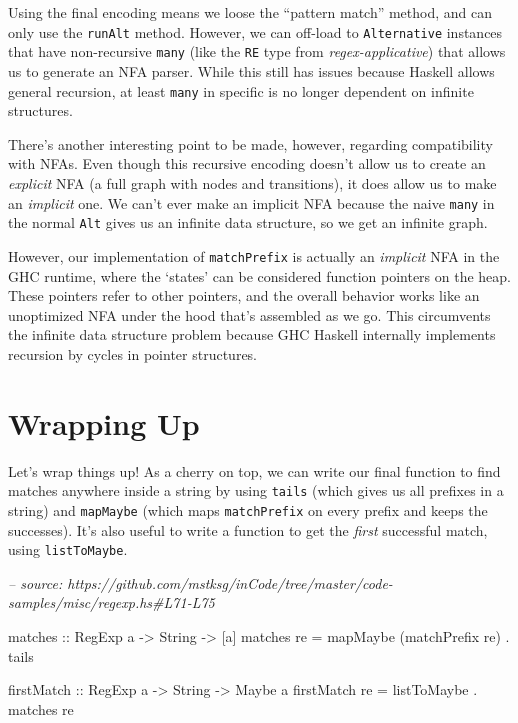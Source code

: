 \documentclass[]{article}
\newenvironment{Shaded}{}{}
\newcommand{\CommentTok}[1]{\textcolor[rgb]{0.38,0.63,0.69}{\textit{#1}}}
\newcommand{\DataTypeTok}[1]{\textcolor[rgb]{0.56,0.13,0.00}{#1}}
\newcommand{\FunctionTok}[1]{\textcolor[rgb]{0.02,0.16,0.49}{#1}}
\newcommand{\NormalTok}[1]{#1}
\newcommand{\OtherTok}[1]{\textcolor[rgb]{0.00,0.44,0.13}{#1}}
\begin{document}
Using the final encoding means we loose the ``pattern match'' method, and can
only use the \texttt{runAlt} method. However, we can off-load to
\texttt{Alternative} instances that have non-recursive \texttt{many} (like the
\texttt{RE} type from \emph{regex-applicative}) that allows us to generate an
NFA parser. While this still has issues because Haskell allows general
recursion, at least \texttt{many} in specific is no longer dependent on infinite
structures.

There's another interesting point to be made, however, regarding compatibility
with NFAs. Even though this recursive encoding doesn't allow us to create an
\emph{explicit} NFA (a full graph with nodes and transitions), it does allow us
to make an \emph{implicit} one. We can't ever make an implicit NFA because the
naive \texttt{many} in the normal \texttt{Alt} gives us an infinite data
structure, so we get an infinite graph.

However, our implementation of \texttt{matchPrefix} is actually an
\emph{implicit} NFA in the GHC runtime, where the `states' can be considered
function pointers on the heap. These pointers refer to other pointers, and the
overall behavior works like an unoptimized NFA under the hood that's assembled
as we go. This circumvents the infinite data structure problem because GHC
Haskell internally implements recursion by cycles in pointer structures.

\hypertarget{wrapping-up}{%
\section{Wrapping Up}\label{wrapping-up}}

Let's wrap things up! As a cherry on top, we can write our final function to
find matches anywhere inside a string by using \texttt{tails} (which gives us
all prefixes in a string) and \texttt{mapMaybe} (which maps \texttt{matchPrefix}
on every prefix and keeps the successes). It's also useful to write a function
to get the \emph{first} successful match, using \texttt{listToMaybe}.

\begin{Shaded}
\begin{Highlighting}[]
\CommentTok{-- source: https://github.com/mstksg/inCode/tree/master/code-samples/misc/regexp.hs#L71-L75}

\OtherTok{matches ::} \DataTypeTok{RegExp}\NormalTok{ a }\OtherTok{->} \DataTypeTok{String} \OtherTok{->}\NormalTok{ [a]}
\NormalTok{matches re }\FunctionTok{=}\NormalTok{ mapMaybe (matchPrefix re) }\FunctionTok{.}\NormalTok{ tails}

\OtherTok{firstMatch ::} \DataTypeTok{RegExp}\NormalTok{ a }\OtherTok{->} \DataTypeTok{String} \OtherTok{->} \DataTypeTok{Maybe}\NormalTok{ a}
\NormalTok{firstMatch re }\FunctionTok{=}\NormalTok{ listToMaybe }\FunctionTok{.}\NormalTok{ matches re}
\end{Highlighting}
\end{Shaded}
\end{document}
